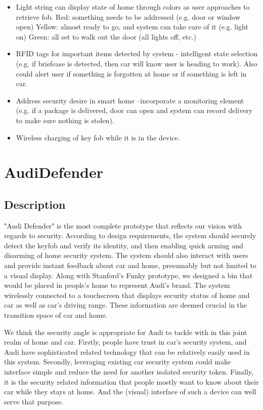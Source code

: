 \begin{itemize}
\item Light string can display state of home through colors as user approaches to retrieve fob.
    \subitem Red: something needs to be addressed (e.g. door or window open)
    \subitem Yellow: almost ready to go, and system can take care of it (e.g. light on)
    \subitem Green: all set to walk out the door (all lights off, etc.)
\item RFID tags for important items detected by system - intelligent state selection (e.g. if briefcase is detected, then car will know user is heading to work). Also could alert user if something is forgotten at home or if something is left in car.
\item Address security desire in smart home –incorporate a monitoring element (e.g. if a package is delivered, door can open and system can record delivery to make sure nothing is stolen).
\item Wireless charging of key fob while it is in the device.
\end{itemize}
\section{AudiDefender}
\subsection{Description}
"Audi Defender" is the most complete prototype that reflects our vision with regards to security. According to design requirements, the system should securely detect the keyfob and verify its identity, and then enabling quick arming and disarming of home security system. The system should also interact with users and provide instant feedback about car and home, presumably but not limited to a visual display. Along with Stanford's Funky prototype, we designed a bin that would be placed in people's home to represent Audi's brand. The system wirelessly connected to a touchscreen that displays security status of home and car as well as car's driving range. These information are deemed crucial in the transition space of car and home. 

We think the security angle is appropriate for Audi to tackle with in this joint realm of home and car. Firstly, people have trust in car's security system, and Audi have sophisticated related technology that can be relatively easily used in this system. Secondly, leveraging existing car security system could make interface simple and reduce the need for another isolated security token. Finally, it is the security related information that people mostly want to know about their car while they stays at home. And the (visual) interface of such a device can well serve that purpose.

